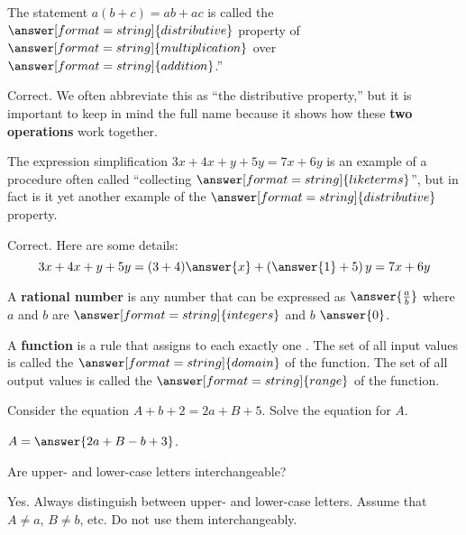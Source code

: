 \documentclass[nooutcomes]{ximera}
\begin{document}
\begin{problem}
The statement $a(b+c)=ab+ac$ is called the $\answer[format=string]{distributive}$ property of $\answer[format=string]{multiplication}$ over $\answer[format=string]{addition}$.'' 
\begin{feedback}
Correct.  We often abbreviate this as ``the distributive property,'' but it is important to keep in mind the full name because it shows how 
these \textbf{two operations} work together. 
\end{feedback}
\end{problem}

\begin{problem}
The expression simplification $3x+4x+y+5y=7x+6y$ is an example of a procedure often called ``collecting 
$\answer[format=string]{like terms}$'', but in fact is it yet another example of the 
$\answer[format=string]{distributive}$ property. 
\begin{problem}
Correct.  Here are some details: 
\[
3x+4x+y+5y=(3+4)\answer{x}+\left(\answer{1}+5\right)y=7x+6y
\]
\end{problem}
\end{problem}

\begin{problem}
A \textbf{rational number} is any number that can be expressed as $\answer{\frac{a}{b}}$ where $a$ and $b$ are $\answer[format=string]{integers}$ and $b$ \wordChoice{\choice{$=$} \choice{$<$} \choice{$>$} \choice[correct]{$\ne$}} $\answer{0}$.
\end{problem}

\begin{problem}
A \textbf{function} is a rule that assigns to each 
 exactly one .  The set of 
all input values is called the $\answer[format=string]{domain}$ of the function.  The set of 
all output values is called the $\answer[format=string]{range}$ of the function.
\end{problem}

\begin{problem}
Consider the equation $A+b+2=2a+B+5$.  Solve the equation for $A$.  

$A=\answer{2a+B-b+3}$.  
\begin{hint}
Are upper- and lower-case letters interchangeable?  
\end{hint}
\begin{feedback}[correct]
Yes.  Always distinguish between upper- and lower-case letters.  Assume that $A\ne a$, $B\ne b$, etc.  Do not use them interchangeably.  
\end{feedback}
\end{problem}
\end{document}
